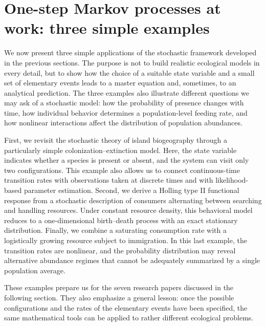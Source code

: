 
\section{One-step Markov processes at work: three simple examples}
We now present three simple applications of the stochastic framework developed in the previous sections. The purpose is not to build realistic ecological models in every detail, but to show how the choice of a suitable state variable and a small set of elementary events leads to a master equation and, sometimes, to an analytical prediction. The three examples also illustrate different questions we may ask of a stochastic model: how the probability of presence changes with time, how individual behavior determines a population-level feeding rate, and how nonlinear interactions affect the distribution of population abundances.

First, we revisit the stochastic theory of island biogeography through a particularly simple colonization--extinction model. Here, the state variable indicates whether a species is present or absent, and the system can visit only two configurations. This example also allows us to connect continuous-time transition rates with observations taken at discrete times and with likelihood-based parameter estimation. Second, we derive a Holling type II functional response from a stochastic description of consumers alternating between searching and handling resources. Under constant resource density, this behavioral model reduces to a one-dimensional birth--death process with an exact stationary distribution. Finally, we combine a saturating consumption rate with a logistically growing resource subject to immigration. In this last example, the transition rates are nonlinear, and the probability distribution may reveal alternative abundance regimes that cannot be adequately summarized by a single population average.

These examples prepare us for the seven research papers discussed in the following section. They also emphasize a general lesson: once the possible configurations and the rates of the elementary events have been specified, the same mathematical tools can be applied to rather different ecological problems.

